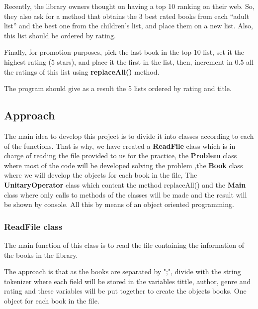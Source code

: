\documentclass[a4paper]{article}
\theoremstyle{plain}
\theoremstyle{definition}
\begin{document}
        Recently, the library owners thought on having a top 10 ranking on their web. So, they also ask for a method that obtains the 3 best rated books from each “adult list” and the best one from the children’s list, and place them on a new list. Also, this list should be ordered by rating.\newline
        
        Finally, for promotion purposes, pick the last book in the top 10 list, set it the highest rating (5 stars), and place
        it the first in the list, then, increment in 0.5 all the ratings of this list using \textbf{replaceAll()} method.\par
        
        The program should give as a result the 5 lists ordered by rating and title.\par

    \subsection{Approach}
	    The main idea to develop this project is to divide it into classes according to each of the functions. That is why, we have created a \textbf{ReadFile} class which is in charge of reading the file provided to us for the practice, the \textbf{Problem} class where most of the code will be developed solving the problem ,the \textbf{Book} class where we will develop the objects for each book in the file, The \textbf{UnitaryOperator} class which content the method replaceAll() and the \textbf{Main} class where only calls to methods of the classes will be made and the result will be shown by console. All this by means of an object oriented programming.
	    
	    
	    
	    \subsubsection{ ReadFile class}
	    The main function of this class is to read the file containing the information of the books in the library. \newline

        The approach is that as the books are separated by ";", divide with the string tokenizer where each field will be stored in the variables tittle, author, genre and rating and these variables will be put together to create the objects books. One object for each book in the file.\newline
\end{document}

